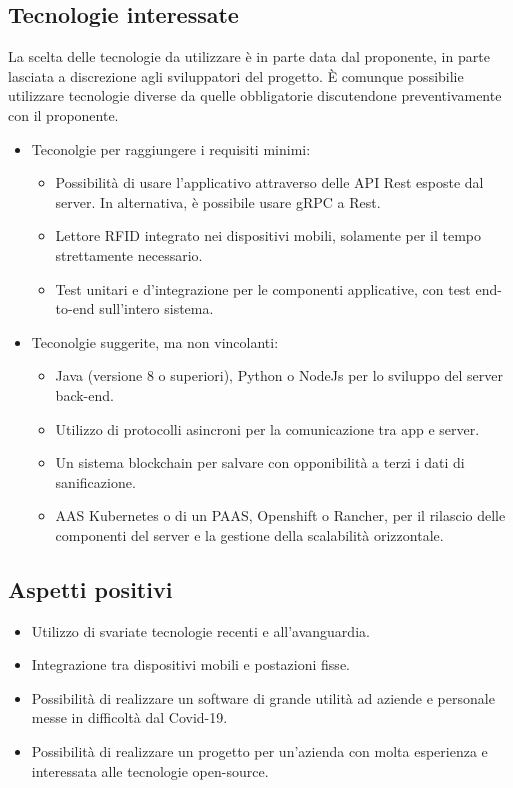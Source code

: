 \subsection{Tecnologie interessate}
La scelta delle tecnologie da utilizzare è in parte data dal proponente, in parte lasciata a discrezione agli sviluppatori del progetto.
È comunque possibilie utilizzare tecnologie diverse da quelle obbligatorie discutendone preventivamente con il proponente.
\begin{itemize}
    \item Teconolgie per raggiungere i requisiti minimi:
    \begin{itemize}
        \item Possibilità di usare l'applicativo attraverso delle API Rest esposte dal server. In alternativa, è possibile usare gRPC a Rest.
        \item Lettore RFID integrato nei dispositivi mobili, solamente per il tempo strettamente necessario.
        \item Test unitari e d'integrazione per le componenti applicative, con test end-to-end sull'intero sistema. 
    \end{itemize}
    \item Teconolgie suggerite, ma non vincolanti:
    \begin{itemize}
        \item Java (versione 8 o superiori), Python o NodeJs per lo sviluppo del server back-end.
        \item Utilizzo di protocolli asincroni per la comunicazione tra app e server.
        \item Un sistema blockchain per salvare con opponibilità a terzi i dati di sanificazione.
        \item AAS Kubernetes o di un PAAS, Openshift o Rancher, per il rilascio delle componenti del server e la gestione della scalabilità orizzontale.
    \end{itemize}
\end{itemize}

\subsection{Aspetti positivi}
\begin{itemize}
    \item Utilizzo di svariate tecnologie recenti e all'avanguardia.
    \item Integrazione tra dispositivi mobili e postazioni fisse.
    \item Possibilità di realizzare un software di grande utilità ad aziende e personale messe in difficoltà dal Covid-19.
    \item Possibilità di realizzare un progetto per un'azienda con molta esperienza e interessata alle tecnologie open-source.
\end{itemize}

